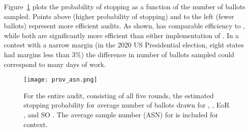 Figure~\ref{fig:prov-asn} plots the probability of stopping as a function of the number of ballots sampled. Points above (higher probability of stopping) and to the left (fewer ballots) represent more efficient audits. As shown, \Providence has comparable efficiency to \Minerva, while both are significantly more efficient than either implementation of \BRAVO. In a contest with a narrow margin (in the 2020 US Presidential election, eight states had margins less than $3\%$) the difference in number of ballots sampled could correspond to many days of work. 

\begin{figure}
\texttt{[image: prov\_asn.png]}
\caption{For the entire audit, consisting of all five rounds, the estimated stopping probability for average number of ballots drawn for \Providence, \Minerva, EoR \BRAVO, and SO \BRAVO. The average sample number (ASN) for \B \BRAVO is included for context.}
\label{fig:prov-asn}
\end{figure}









